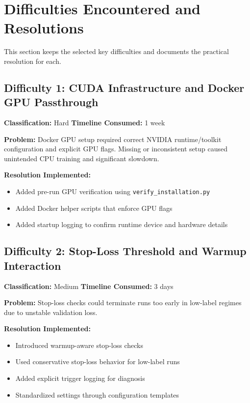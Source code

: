 \section{Difficulties Encountered and Resolutions}

This section keeps the selected key difficulties and documents the practical resolution for each.

\subsection{Difficulty 1: CUDA Infrastructure and Docker GPU Passthrough}

\textbf{Classification:} Hard \quad \textbf{Timeline Consumed:} 1 week

\textbf{Problem:}
Docker GPU setup required correct NVIDIA runtime/toolkit configuration and explicit GPU flags. Missing or inconsistent setup caused unintended CPU training and significant slowdown.

\textbf{Resolution Implemented:}

\begin{itemize}
    \item Added pre-run GPU verification using \texttt{verify\_installation.py}
    \item Added Docker helper scripts that enforce GPU flags
    \item Added startup logging to confirm runtime device and hardware details
\end{itemize}

\subsection{Difficulty 2: Stop-Loss Threshold and Warmup Interaction}

\textbf{Classification:} Medium \quad \textbf{Timeline Consumed:} 3 days

\textbf{Problem:}
Stop-loss checks could terminate runs too early in low-label regimes due to unstable validation loss.

\textbf{Resolution Implemented:}

\begin{itemize}
    \item Introduced warmup-aware stop-loss checks
    \item Used conservative stop-loss behavior for low-label runs
    \item Added explicit trigger logging for diagnosis
    \item Standardized settings through configuration templates
\end{itemize}

